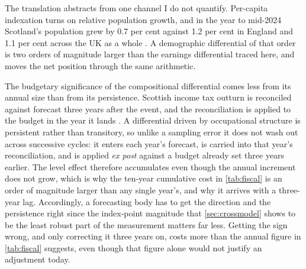 The translation abstracts from one channel I do not quantify. Per-capita indexation turns on relative population growth, and in the year to mid-2024 Scotland's population grew by 0.7 per cent against 1.2 per cent in England and 1.1 per cent across the UK as a whole \citep{park2023}. A demographic differential of that order is two orders of magnitude larger than the earnings differential traced here, and moves the net position through the same arithmetic.

The budgetary significance of the compositional differential comes less from its annual size than from its persistence. Scottish income tax outturn is reconciled against forecast three years after the event, and the reconciliation is applied to the budget in the year it lands \citep{gov2023}. A differential driven by occupational structure is persistent rather than transitory, so unlike a sampling error it does not wash out across successive cycles: it enters each year's forecast, is carried into that year's reconciliation, and is applied \textit{ex post} against a budget already set three years earlier. The level effect therefore accumulates even though the annual increment does not grow, which is why the ten-year cumulative cost in \cref{tab:fiscal} is an order of magnitude larger than any single year's, and why it arrives with a three-year lag. Accordingly, a forecasting body has to get the direction and the persistence right since the index-point magnitude that \cref{sec:crossmodel} shows to be the least robust part of the measurement matters far less. Getting the sign wrong, and only correcting it three years on, costs more than the annual figure in \cref{tab:fiscal} suggests, even though that figure alone would not justify an adjustment today.

